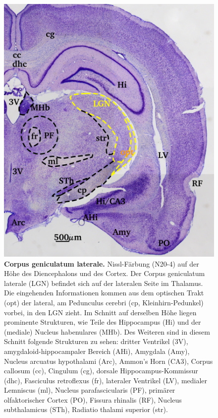 \begin{figure}[H]
    \centering
    \includegraphics{pictures/visual/LGN.png}
    \caption[Corpus geniculatum laterale]{\textbf{Corpus geniculatum laterale.} Nissl-Färbung (N20-4) auf der Höhe des Diencephalons und des Cortex. Der Corpus geniculatum laterale (LGN) befindet sich auf der lateralen Seite im Thalamus. Die eingehenden Informationen kommen aus dem optischen Trakt (opt) der lateral, am Pedunculus cerebri (cp, Kleinhirn-Pedunkel) vorbei, in den LGN zieht. Im Schnitt auf derselben Höhe liegen prominente Strukturen, wie Teile des Hippocampus (Hi) und der (mediale) Nucleus habenulares (MHb). Des Weiteren sind in diesem Schnitt folgende Strukturen zu sehen: 
    dritter Ventrikel (3V), amygdaloid-hippocampaler Bereich (AHi), Amygdala (Amy), Nucleus arcuatus hypothalami (Arc), Ammon's Horn (CA3), Corpus callosum (cc), Cingulum (cg), dorsale Hippocampus-Kommissur (dhc), Fasciculus retroflexus (fr), lateraler Ventrikel (LV), medialer Lemniscus (ml), Nucleus parafascicularis (PF),  primärer  olfaktorischer  Cortex (PO), Fissura rhinalis (RF), Nucleus subthalamicus (STh), Radiatio thalami superior (str).}
    \label{fig:LGN}
\end{figure}

